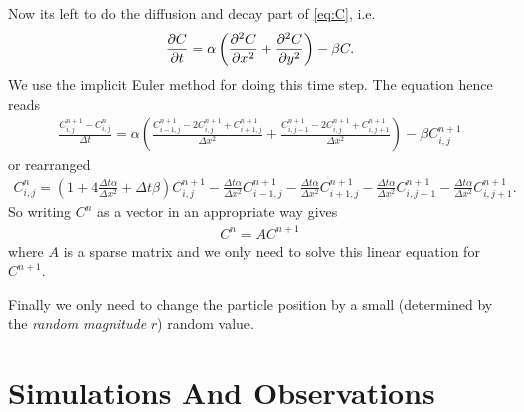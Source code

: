 \documentclass{class}
\begin{document}
Now its left to do the diffusion and decay part of \autoref{eq:C}, i.e.
\begin{align*}
    \pdv{C}{t}=\alpha\left(\pdv[2]{C}{x}+\pdv[2]{C}{y}\right)-\beta C.
\end{align*}
We use the implicit Euler method for doing this time step. The equation hence reads
\begin{align*}
    \frac{C^{n+1}_{i,j}-C^n_{i,j}}{\Delta t}
    =\alpha\left(\frac{C^{n+1}_{i-1,j}-2C^{n+1}_{i,j}+C^{n+1}_{i+1,j}}{\Delta x^2}+\frac{C^{n+1}_{i,j-1}-2C^{n+1}_{i,j}+C^{n+1}_{i,j+1}}{\Delta x^2}\right)-\beta C^{n+1}_{i,j}
\end{align*}
or rearranged
\begin{align*}
    C^n_{i,j}
    =\left(1+4\frac{\Delta t\alpha}{\Delta x^2}+\Delta t\beta\right)C^{n+1}_{i,j}-\frac{\Delta t\alpha}{\Delta x^2}C^{n+1}_{i-1,j}-\frac{\Delta t\alpha}{\Delta x^2}C^{n+1}_{i+1,j}-\frac{\Delta t\alpha}{\Delta x^2}C^{n+1}_{i,j-1}-\frac{\Delta t\alpha}{\Delta x^2}C^{n+1}_{i,j+1}.
\end{align*}
So writing $C^n$ as a vector in an appropriate way gives
\begin{align*}
    C^n=AC^{n+1}
\end{align*}
where $A$ is a sparse matrix and we only need to solve this linear equation for $C^{n+1}$.

Finally we only need to change the particle position by a small (determined by the \emph{random magnitude} $r$) random value.

\section{Simulations And Observations}
\end{document}
